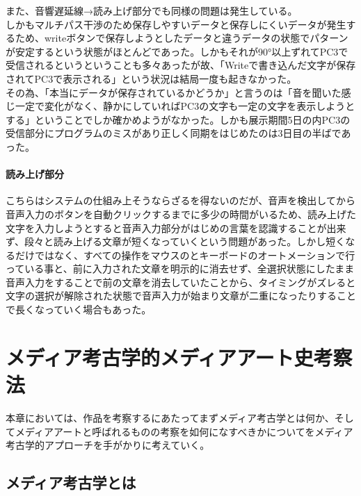 \documentclass[a4paper,report]{jsbook}
\begin{document}
また、音響遅延線→読み上げ部分でも同様の問題は発生している。\\
しかもマルチパス干渉のため保存しやすいデータと保存しにくいデータが発生するため、writeボタンで保存しようとしたデータと違うデータの状態でパターンが安定するという状態がほとんどであった。しかもそれが90°以上ずれてPC3で受信されるというということも多々あったが故、「Writeで書き込んだ文字が保存されてPC3で表示される」という状況は結局一度も起きなかった。\\
その為、「本当にデータが保存されているかどうか」と言うのは「音を聞いた感じ一定で変化がなく、静かにしていればPC3の文字も一定の文字を表示しようとする」ということでしか確かめようがなかった。しかも展示期間5日の内PC3の受信部分にプログラムのミスがあり正しく同期をはじめたのは3日目の半ばであった。

\subsubsection{読み上げ部分}\label{ux8aadux307fux4e0aux3052ux90e8ux5206}

こちらはシステムの仕組み上そうならざるを得ないのだが、音声を検出してから音声入力のボタンを自動クリックするまでに多少の時間がいるため、読み上げた文字を入力しようとすると音声入力部分がはじめの言葉を認識することが出来ず、段々と読み上げる文章が短くなっていくという問題があった。しかし短くなるだけではなく、すべての操作をマウスのとキーボードのオートメーションで行っている事と、前に入力された文章を明示的に消去せず、全選択状態にしたまま音声入力をすることで前の文章を消去していたことから、タイミングがズレると文字の選択が解除された状態で音声入力が始まり文章が二重になったりすることで長くなっていく場合もあった。

\chapter{メディア考古学的メディアアート史考察法}\label{ux30e1ux30c7ux30a3ux30a2ux8003ux53e4ux5b66ux7684ux30e1ux30c7ux30a3ux30a2ux30a2ux30fcux30c8ux53f2ux8003ux5bdfux6cd5}

本章においては、作品を考察するにあたってまずメディア考古学とは何か、そしてメディアアートと呼ばれるものの考察を如何になすべきかについてをメディア考古学的アプローチを手がかりに考えていく。

\section{メディア考古学とは}\label{ux30e1ux30c7ux30a3ux30a2ux8003ux53e4ux5b66ux3068ux306f}
\end{document}
